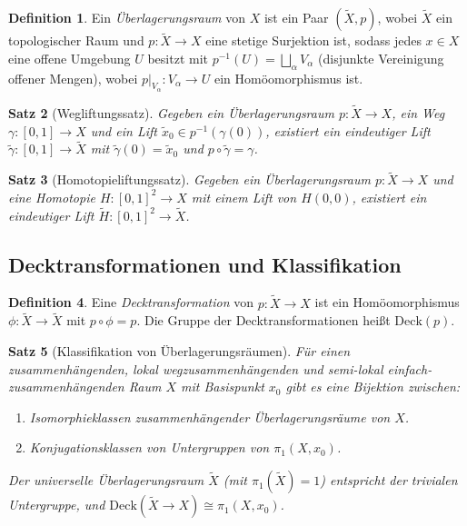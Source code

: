 \documentclass[12pt,a4paper]{amsart}
\newtheorem{theorem}{Satz}[section]
\theoremstyle{definition}
\newtheorem{definition}[theorem]{Definition}
\begin{document}
\begin{definition}
Ein \emph{\"Uberlagerungsraum} von $X$ ist ein Paar $(\tilde{X}, p)$, wobei
$\tilde{X}$ ein topologischer Raum und $p\colon \tilde{X} \to X$ eine stetige
Surjektion ist, sodass jedes $x \in X$ eine offene Umgebung $U$ besitzt mit
$p^{-1}(U) = \bigsqcup_\alpha V_\alpha$ (disjunkte Vereinigung offener Mengen),
wobei $p|_{V_\alpha}\colon V_\alpha \to U$ ein Hom\"oomorphismus ist.
\end{definition}

\begin{theorem}[Wegliftungssatz]
Gegeben ein \"Uberlagerungsraum $p\colon \tilde{X} \to X$, ein Weg
$\gamma\colon [0,1] \to X$ und ein Lift $\tilde{x}_0 \in p^{-1}(\gamma(0))$,
existiert ein eindeutiger Lift $\tilde{\gamma}\colon [0,1] \to \tilde{X}$
mit $\tilde{\gamma}(0) = \tilde{x}_0$ und $p \circ \tilde{\gamma} = \gamma$.
\end{theorem}

\begin{theorem}[Homotopieliftungssatz]
Gegeben ein \"Uberlagerungsraum $p\colon \tilde{X} \to X$ und eine Homotopie
$H\colon [0,1]^2 \to X$ mit einem Lift von $H(0,0)$, existiert ein eindeutiger
Lift $\tilde{H}\colon [0,1]^2 \to \tilde{X}$.
\end{theorem}

\subsection{Decktransformationen und Klassifikation}

\begin{definition}
Eine \emph{Decktransformation} von $p\colon \tilde{X} \to X$ ist ein
Hom\"oomorphismus $\phi\colon \tilde{X} \to \tilde{X}$ mit $p \circ \phi = p$.
Die Gruppe der Decktransformationen hei\ss{}t $\mathrm{Deck}(p)$.
\end{definition}

\begin{theorem}[Klassifikation von \"Uberlagerungsr\"aumen]
\label{thm:ueberlagerung_klassifikation}
F\"ur einen zusammenh\"angenden, lokal wegzusammenh\"angenden und semi-lokal
einfach-zusammenh\"angenden Raum $X$ mit Basispunkt $x_0$ gibt es eine Bijektion
zwischen:
\begin{enumerate}[label=(\roman*)]
  \item Isomorphieklassen zusammenh\"angender \"Uberlagerungsr\"aume von $X$.
  \item Konjugationsklassen von Untergruppen von $\pi_1(X, x_0)$.
\end{enumerate}
Der \emph{universelle \"Uberlagerungsraum} $\tilde{X}$ (mit
$\pi_1(\tilde{X}) = 1$) entspricht der trivialen Untergruppe, und
$\mathrm{Deck}(\tilde{X} \to X) \cong \pi_1(X, x_0)$.
\end{theorem}
\end{document}
